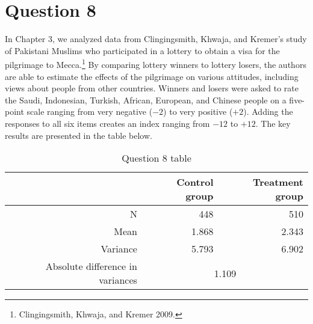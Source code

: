 \documentclass[11pt,notitlepage]{article}\usepackage[]{graphicx}\usepackage[]{color}
\begin{document}
\section*{Question 8}
In Chapter 3, we analyzed data from Clingingsmith, Khwaja, and Kremer's study of Pakistani Muslims who participated in a lottery to obtain a visa for the pilgrimage to Mecca.\footnote{Clingingsmith, Khwaja, and Kremer 2009.} By comparing lottery winners to lottery losers, the authors are able to estimate the effects of the pilgrimage on various attitudes, including views about people from other countries. Winners and losers were asked to rate the Saudi, Indonesian, Turkish, African, European, and Chinese people on a five-point scale ranging from very negative ($-2$) to very positive ($+2$). Adding the responses to all six items creates an index ranging from $-12$ to $+12$. The key results are presented in the table below.

\begin{table}[htbp]
  \centering
  \caption{Question 8 table}
    \begin{tabular}{rrr}
    \toprule
          & Control group  & Treatment group  \\
    \midrule
    N     & 448   & 510 \\
    Mean  & 1.868 & 2.343 \\
    Variance  & 5.793 & 6.902 \\
    Absolute difference in variances  & \multicolumn{2}{c}{1.109} \\
    \bottomrule
    \end{tabular}%
  \label{tab:addlabel}%
\end{table}%
\end{document}
